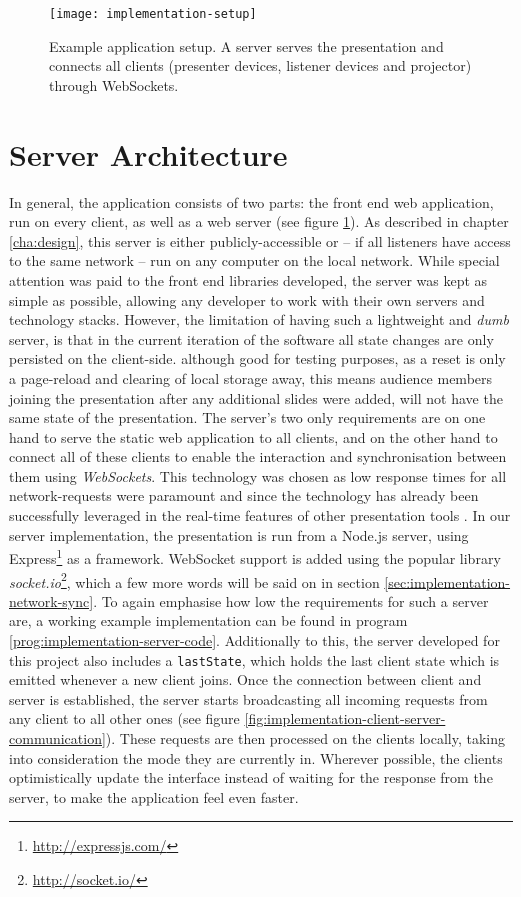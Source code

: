 \begin{figure}
\centering
\texttt{[image: implementation-setup]}
\caption{Example application setup. A server serves the presentation and connects all clients (presenter devices, listener devices and projector) through WebSockets.}
\label{fig:implementation-architecture-setup}
\end{figure}

\section{Server Architecture}

In general, the application consists of two parts: the front end web application, run on every client, as well as a web server (see figure \ref{fig:implementation-architecture-setup}). As described in chapter \ref{cha:design}, this server is either publicly-accessible or -- if all listeners have access to the same network -- run on any computer on the local network. While special attention was paid to the front end libraries developed, the server was kept as simple as possible, allowing any developer to work with their own servers and technology stacks. However, the limitation of having such a lightweight and \emph{dumb} server, is that in the current iteration of the software all state changes are only persisted on the client-side. although good for testing purposes, as a reset is only a page-reload and clearing of local storage away, this means audience members joining the presentation after any additional slides were added, will not have the same state of the presentation. The server's two only requirements are on one hand to serve the static web application to all clients, and on the other hand to connect all of these clients to enable the interaction and synchronisation between them using \emph{WebSockets}. This technology was chosen as low response times for all network-requests were paramount and since the technology has already been successfully leveraged in the real-time features of other presentation tools \cite{Inoue:RealTimeQuestionnaire, Triglianos:InteractiveWebPresentationsImpress}. In our server implementation, the presentation is run from a Node.js server, using Express\footnote{\url{http://expressjs.com/}} as a framework. WebSocket support is added using the popular library \emph{socket.io}\footnote{\url{http://socket.io/}}, which a few more words will be said on in section \ref{sec:implementation-network-sync}.
To again emphasise how low the requirements for such a server are, a working example implementation can be found in program \ref{prog:implementation-server-code}. Additionally to this, the server developed for this project also includes a \texttt{lastState}, which holds the last client state which is emitted whenever a new client joins. Once the connection between client and server is established, the server starts broadcasting all incoming requests from any client to all other ones (see figure \ref{fig:implementation-client-server-communication}). These requests are then processed on the clients locally, taking into consideration the mode they are currently in. Wherever possible, the clients optimistically update the interface instead of waiting for the response from the server, to make the application feel even faster.
